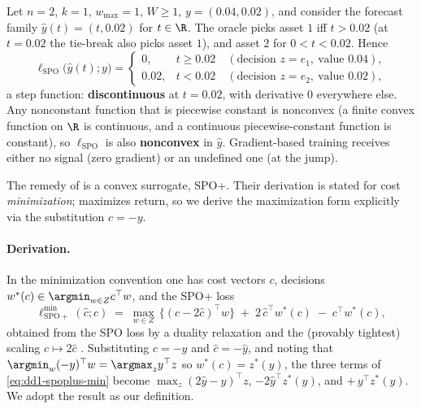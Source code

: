 \begin{example}
\label{ex:dd1-spo-discont}
Let $n = 2$, $k = 1$, $w_{\max} = 1$, $W \ge 1$, $y = (0.04, 0.02)$, and
consider the forecast family $\hat{y}(t) = (t, 0.02)$ for $t \in \R$. The
oracle picks asset $1$ iff $t > 0.02$ (at $t = 0.02$ the tie-break also picks
asset $1$), and asset $2$ for $0 < t < 0.02$. Hence
\[
\ell_{\mathrm{SPO}}\bigl(\hat{y}(t); y\bigr) =
\begin{cases}
0, & t \ge 0.02 \quad (\text{decision } z = e_1,\ \text{value } 0.04),\\[2pt]
0.02, & t < 0.02 \quad (\text{decision } z = e_2,\ \text{value } 0.02),
\end{cases}
\]
a step function: \textbf{discontinuous} at $t = 0.02$, with derivative $0$
everywhere else. Any nonconstant function that is piecewise constant is
nonconvex (a finite convex function on $\R$ is continuous, and a continuous
piecewise-constant function is constant), so $\ell_{\mathrm{SPO}}$ is also
\textbf{nonconvex} in $\hat{y}$. Gradient-based training receives either no
signal (zero gradient) or an undefined one (at the jump).
\end{example}

The remedy of \cite{elmachtoub2022smart} is a convex surrogate, SPO+. Their
derivation is stated for cost \emph{minimization}; \nm{} maximizes return, so
we derive the maximization form explicitly via the substitution $c = -y$.

\paragraph{Derivation.} In the minimization convention one has cost vectors
$c$, decisions $w^*(c) \in \argmin_{w \in Z} c^\top w$, and the SPO+ loss
\begin{equation}
\label{eq:dd1-spoplus-min}
\ell_{\mathrm{SPO+}}^{\min}(\hat{c}; c)
\;=\; \max_{w \in Z}\,\bigl\{ (c - 2\hat{c})^\top w \bigr\}
\;+\; 2\,\hat{c}^\top w^*(c) \;-\; c^\top w^*(c),
\end{equation}
obtained from the SPO loss by a duality relaxation and the (provably
tightest) scaling $\hat{c} \mapsto 2\hat{c}$ \cite{elmachtoub2022smart}.
Substituting $c = -y$ and $\hat{c} = -\hat{y}$, and noting that
$\argmin_{w} (-y)^\top w = \argmax_{z} y^\top z$ so $w^*(c) = z^*(y)$, the
three terms of \eqref{eq:dd1-spoplus-min} become
$\max_z (2\hat{y} - y)^\top z$, $-2\hat{y}^\top z^*(y)$, and
$+\,y^\top z^*(y)$. We adopt the result as our definition.

